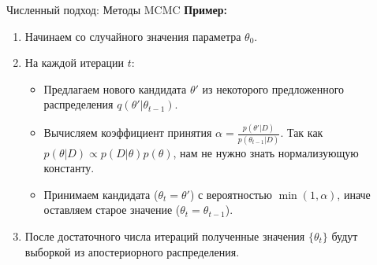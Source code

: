 \documentclass[notheorems, handout]{beamer}
\begin{document}
\begin{frame}{Численный подход: Методы MCMC}
  \textbf{Пример:}
  \begin{enumerate}
    \item Начинаем со случайного значения параметра $\theta_0$.
    \item На каждой итерации $t$:
      \begin{itemize}
        \item Предлагаем нового кандидата $\theta'$ из некоторого
          предложенного распределения $q(\theta'|\theta_{t-1})$.
        \item Вычисляем коэффициент принятия $\alpha =
          \frac{p(\theta'|D)}{p(\theta_{t-1}|D)}$. Так как
          $p(\theta|D) \propto p(D|\theta)p(\theta)$, нам не нужно
          знать нормализующую константу.
        \item Принимаем кандидата ($\theta_t = \theta'$) с
          вероятностью $\min(1, \alpha)$, иначе оставляем старое
          значение ($\theta_t = \theta_{t-1}$).
      \end{itemize}
    \item После достаточного числа итераций полученные значения
      $\{\theta_t\}$ будут выборкой из апостериорного распределения.
  \end{enumerate}
\end{frame}
\end{document}
